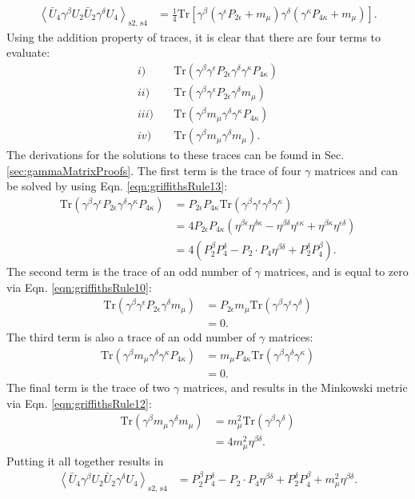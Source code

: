 \begin{align*}
\left< \bar{U}_4 \gamma^\beta U_2 \bar{U}_2 \gamma^\delta U_4 \right> _\text{s2, s4}
&=\frac{1}{4}\text{Tr}[\gamma^\beta(\gamma^\epsilon P_{2\epsilon}+m_\mu)\gamma^\delta (\gamma^\kappa P_{4\kappa}+m_\mu)].
\end{align*}
Using the addition property of traces, it is clear that there are four terms to evaluate:
\begin{align*}
i) &\quad \text{Tr}(\gamma^\beta \gamma^\epsilon P_{2\epsilon}\gamma^\delta\gamma^\kappa P_{4\kappa})\\
ii) &\quad \text{Tr}(\gamma^\beta \gamma^\epsilon P_{2\epsilon}\gamma^\delta m_\mu)\\
iii) &\quad \text{Tr}(\gamma^\beta m_\mu \gamma^\delta\gamma^\kappa P_{4\kappa})\\
iv) &\quad \text{Tr}(\gamma^\beta m_\mu \gamma^\delta m_\mu).
\end{align*}
The derivations for the solutions to these traces can be found in Sec. \ref{sec:gammaMatrixProofs}. The first term is the trace of four $\gamma$ matrices and can be solved by using Eqn. \ref{eqn:griffithsRule13}:
\begin{align*}
\text{Tr}(\gamma^\beta \gamma^\epsilon P_{2\epsilon}\gamma^\delta\gamma^\kappa P_{4\kappa})
&= P_{2\epsilon}P_{4\kappa}\text{Tr}(\gamma^\beta \gamma^\epsilon\gamma^\delta\gamma^\kappa)\\
&=4P_{2\epsilon} P_{4\kappa} (\eta^{\beta\epsilon}\eta^{\delta\kappa}-\eta^{\beta\delta}\eta^{\epsilon\kappa}+\eta^{\beta\kappa}\eta^{\epsilon\delta})\\
&=4(P_2 ^\beta P_4 ^\delta - P_2 \cdot P_4 \eta^{\beta\delta} + P_2 ^\delta P_4 ^\beta).
\end{align*}
The second term is the trace of an odd number of $\gamma$ matrices, and is equal to zero via Eqn. \ref{eqn:griffithsRule10}:
\begin{align*}
\text{Tr}(\gamma^\beta \gamma^\epsilon P_{2\epsilon}\gamma^\delta m_\mu)
&= P_{2\epsilon}m_\mu\text{Tr}(\gamma^\beta \gamma^\epsilon\gamma^\delta)\\
&=0.
\end{align*}
The third term is also a trace of an odd number of $\gamma$ matrices:
\begin{align*}
\text{Tr}(\gamma^\beta m_\mu \gamma^\delta\gamma^\kappa P_{4\kappa})
&=m_\mu P_{4\kappa} \text{Tr}(\gamma^\beta  \gamma^\delta\gamma^\kappa)\\
&=0.
\end{align*}
The final term is the trace of two $\gamma$ matrices, and results in the Minkowski metric via Eqn. \ref{eqn:griffithsRule12}:
\begin{align*}
\text{Tr}(\gamma^\beta m_\mu \gamma^\delta m_\mu)
&=m_\mu ^2 \text{Tr}(\gamma^\beta \gamma^\delta)\\
&=4 m_\mu ^2 \eta^{\beta\delta}.
\end{align*}
Putting it all together results in
\begin{align*}
\left< \bar{U}_4 \gamma^\beta U_2 \bar{U}_2 \gamma^\delta U_4 \right> _\text{s2, s4}
&=P_2^\beta P_4^\delta - P_2 \cdot P_4 \eta^{\beta\delta}+P_2 ^\delta P_4 ^\beta + m_\mu ^2 \eta^{\beta\delta}.
\end{align*}

